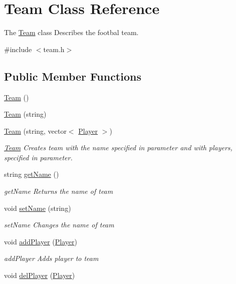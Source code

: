 \hypertarget{class_team}{\section{Team Class Reference}
\label{class_team}
}


The \hyperlink{class_team}{Team} class Describes the footbal team.  




{\ttfamily \#include $<$team.\-h$>$}

\subsection*{Public Member Functions}
\begin{DoxyCompactItemize}
\item 
\hyperlink{class_team_aada295895b747960576b69d8c87a54ba}{Team} ()
\item 
\hyperlink{class_team_a6209508aa24d5a1266fb95ce5e5e2651}{Team} (string)
\item 
\hyperlink{class_team_abb6230026200657d6fff9df436835729}{Team} (string, vector$<$ \hyperlink{class_player}{Player} $>$)
\begin{DoxyCompactList}\small\item\em \hyperlink{class_team}{Team} Creates team with the name specified in parameter and with players, specified in parameter. \end{DoxyCompactList}\item 
string \hyperlink{class_team_ab21736a411213da36d08210e570ecbeb}{get\-Name} ()
\begin{DoxyCompactList}\small\item\em get\-Name Returns the name of team \end{DoxyCompactList}\item 
void \hyperlink{class_team_a840a65b79f7d718965831611e72b6ac2}{set\-Name} (string)
\begin{DoxyCompactList}\small\item\em set\-Name Changes the name of team \end{DoxyCompactList}\item 
void \hyperlink{class_team_a59c401173c3bd78e4ce802e0c56c9066}{add\-Player} (\hyperlink{class_player}{Player})
\begin{DoxyCompactList}\small\item\em add\-Player Adds player to team \end{DoxyCompactList}\item 
void \hyperlink{class_team_ae7e10897ad329c6884b427d4405b85b0}{del\-Player} (\hyperlink{class_player}{Player})

\end{DoxyCompactItemize}
